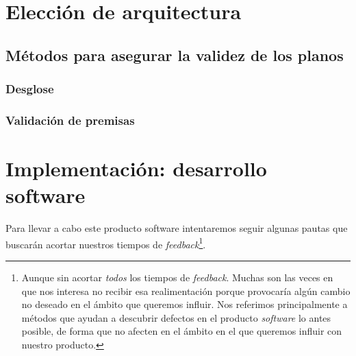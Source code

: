 \section{Elección de arquitectura}


\subsection{Métodos para asegurar la validez de los planos}

\subsubsection{Desglose}

\subsubsection{Validación de premisas}



\section{Implementación: desarrollo software}

Para llevar a cabo este producto software intentaremos seguir algunas
pautas que buscarán acortar nuestros tiempos de \textit{feedback}\footnote{%
    Aunque sin acortar \textit{todos} los tiempos de \textit{feedback}. Muchas son las
    veces en que nos interesa no recibir esa realimentación porque provocaría
    algún cambio no deseado en el ámbito que queremos influir. Nos referimos
    principalmente a métodos que ayudan a descubrir defectos en el producto
    \textit{software} lo antes posible, de forma que no afecten en el ámbito en el que
    queremos influir con nuestro producto.
}.

